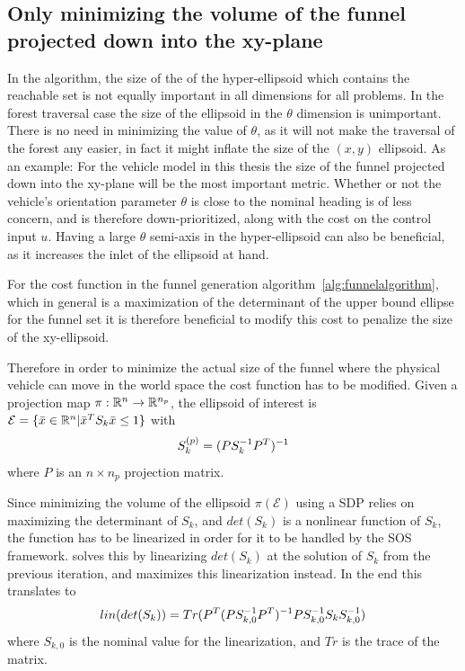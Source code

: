 \subsection{Only minimizing the volume of the funnel projected down into the
  xy-plane}
\label{subsec:xy-cost-function}

In the \rrtfunnel{} algorithm, the size of the of the hyper-ellipsoid which
contains the reachable set is not equally important in all dimensions for all
problems. In the forest traversal case the size of the ellipsoid in the
\(\theta\) dimension is unimportant. There is no need in minimizing the value of
\(\theta\), as it will not make the traversal of the forest any easier, in fact
it might inflate the size of the \((x,y)\) ellipsoid. As an example: For the
vehicle model in this thesis the size of the funnel projected down into the
xy-plane will be the most important metric. Whether or not the vehicle's
orientation parameter \(\theta\) is close to the nominal heading is of less
concern, and is therefore down-prioritized, along with the cost on the control
input \(u\). Having a large \(\theta\) semi-axis in the hyper-ellipsoid can also
be beneficial, as it increases the inlet of the ellipsoid at hand.

For the cost function in the funnel generation
algorithm~\cref{alg:funnelalgorithm}, which in general is a maximization of the
determinant of the upper bound ellipse for the funnel set it is therefore
beneficial to modify this cost to penalize the size of the xy-ellipsoid.

Therefore in order to minimize the actual size of the funnel where the physical
vehicle can move in the world space the cost function has to be modified. Given
a projection map \(\pi : \mathbb{R}^n \rightarrow \mathbb{R}^{n_p}\), the ellipsoid of interest
is \(\mathcal{E} = \lbrace\bar{x} \in \mathbb{R}^n | \bar{x}^TS_{k}\bar{x} \leq 1\rbrace\) with
\[
  S_k^{(p)} = \lparen PS_k^{-1}P^T\rparen^{-1}
\]
where \(P\) is an \(n\times n_p\) projection matrix.

Since minimizing the volume of the ellipsoid \(\pi(\mathcal{E})\) using a
\ac{SDP} relies on maximizing the determinant of \(S_k\), and \(det(S_k)\) is a
nonlinear function of \(S_k\), the function has to be linearized in order for it
to be handled by the \ac{SOS} framework.
\cite[Majumdar]{majumdarFunnelLibrariesRealtime2017} solves this by linearizing
\(det(S_k)\) at the solution of \(S_k\) from the previous iteration, and
maximizes this linearization instead. In the end this translates to
\[
  \mathnormal{lin}\lparen det\lparen S_k\rparen\rparen =
  Tr\lparen P^T\lparen PS_{k,0}^{-1}P^T\rparen^{-1}PS_{k,0}^{-1}S_kS_{k,0}^{-1}\rparen
\]
where \(S_{k,0}\) is the nominal value for the linearization, and \(Tr\) is the
trace of the matrix.

